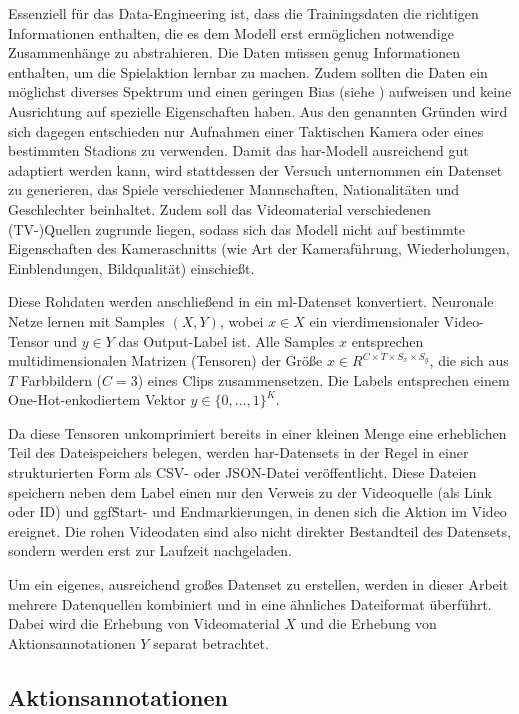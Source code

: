 Essenziell für das Data-Engineering ist, dass die Trainingsdaten die richtigen Informationen enthalten, die es dem Modell erst ermöglichen notwendige Zusammenhänge zu abstrahieren.
Die Daten müssen genug Informationen enthalten, um die Spielaktion lernbar zu machen.
Zudem sollten die Daten ein möglichst diverses Spektrum und einen geringen Bias (siehe \cite{Gugger20}) aufweisen und keine Ausrichtung auf spezielle Eigenschaften haben.
Aus den genannten Gründen wird sich dagegen entschieden nur Aufnahmen einer Taktischen Kamera oder eines bestimmten Stadions zu verwenden.
Damit das \gls{har}-Modell ausreichend gut adaptiert werden kann, wird stattdessen der Versuch unternommen ein Datenset zu generieren, das Spiele verschiedener Mannschaften, Nationalitäten und Geschlechter beinhaltet.
Zudem soll das Videomaterial verschiedenen (TV-)Quellen zugrunde liegen, sodass sich das Modell nicht auf bestimmte Eigenschaften des Kameraschnitts (wie Art der Kameraführung, Wiederholungen, Einblendungen, Bildqualität) einschießt.

Diese Rohdaten werden anschließend in ein \gls{ml}-Datenset konvertiert.
Neuronale Netze lernen mit Samples $(X, Y)$, wobei $x \in X$ ein vierdimensionaler Video-Tensor und $y \in Y$ das Output-Label ist.
Alle Samples $x$ entsprechen multidimensionalen Matrizen (Tensoren) der Größe $x \in R^{C \times T \times S_x \times S_y}$, die sich aus $T$ Farbbildern ($C=3$) eines Clips zusammensetzen.
Die Labels entsprechen einem One-Hot-enkodiertem Vektor $y \in \{0, \dots, 1\}^K$.

Da diese Tensoren unkomprimiert bereits in einer kleinen Menge eine erheblichen Teil des Dateispeichers belegen, werden \gls{har}-Datensets in der Regel in einer strukturierten Form als CSV- oder JSON-Datei veröffentlicht.
Diese Dateien speichern neben dem Label einen nur den Verweis zu der Videoquelle (als Link oder ID) und ggf\. Start- und Endmarkierungen, in denen sich die Aktion im Video ereignet.
Die rohen Videodaten sind also nicht direkter Bestandteil des Datensets, sondern werden erst zur Laufzeit nachgeladen.

Um ein eigenes, ausreichend großes Datenset zu erstellen, werden in dieser Arbeit mehrere Datenquellen kombiniert und in eine ähnliches Dateiformat überführt.
Dabei wird die Erhebung von Videomaterial $X$ und die Erhebung von Aktionsannotationen $Y$ separat betrachtet.

\subsection{Aktionsannotationen}
\label{subsec:aktionsannotationen}

